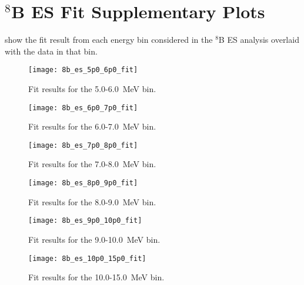 \chapter{\texorpdfstring{{\snop} $^8$B}{SNO+ Boron-8} ES Fit Supplementary Plots}
\label{chap:solar_bins}

 show the fit result from each energy bin considered in the {\snop} $^8$B ES analysis overlaid with the data in that bin.

\begin{figure}
\centering
\texttt{[image: 8b\_es\_5p0\_6p0\_fit]}
\caption{\label{fig:56}Fit results for the 5.0-6.0~MeV bin.}
\end{figure}

\begin{figure}
\centering
\texttt{[image: 8b\_es\_6p0\_7p0\_fit]}
\caption{\label{fig:67}Fit results for the 6.0-7.0~MeV bin.}
\end{figure}

\begin{figure}
\centering
\texttt{[image: 8b\_es\_7p0\_8p0\_fit]}
\caption{\label{fig:78}Fit results for the 7.0-8.0~MeV bin.}
\end{figure}

\begin{figure}
\centering
\texttt{[image: 8b\_es\_8p0\_9p0\_fit]}
\caption{\label{fig:89}Fit results for the 8.0-9.0~MeV bin.}
\end{figure}

\begin{figure}
\centering
\texttt{[image: 8b\_es\_9p0\_10p0\_fit]}
\caption{\label{fig:910}Fit results for the 9.0-10.0~MeV bin.}
\end{figure}

\begin{figure}
\centering
\texttt{[image: 8b\_es\_10p0\_15p0\_fit]}
\caption{\label{fig:1015}Fit results for the 10.0-15.0~MeV bin.}
\end{figure}


\clearpage
